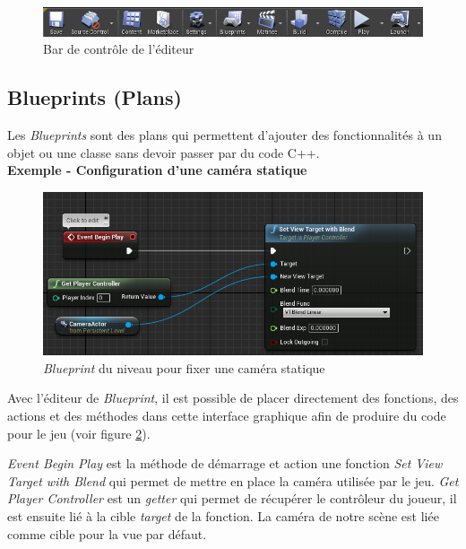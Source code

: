 \documentclass[11pt, a4paper, oneside]{article}
\begin{document}
\begin{center}
\begin{figure}[htp]
\includegraphics[scale=.8]{bardecontrole}
\caption{Bar de contrôle de l'éditeur}
\label{fig:bardecontrole}
\end{figure}
\end{center}

\subsection{Blueprints (Plans)}
Les \emph{Blueprints} sont des plans qui permettent d'ajouter des fonctionnalités à un objet ou une classe sans devoir passer par du code C++.\\[.4cm]
\textbf{Exemple - Configuration d'une caméra statique}
\begin{center}
\begin{figure}[htp]
\includegraphics[scale=.8]{blueprint}
\caption{\emph{Blueprint} du niveau pour fixer une caméra statique}
\label{fig:blueprint}
\end{figure}
\end{center}

Avec l'éditeur de \emph{Blueprint}, il est possible de placer directement des fonctions, des actions et des méthodes dans cette interface graphique afin de produire du code pour le jeu (voir figure \ref{fig:blueprint}).

\emph{Event Begin Play} est la méthode de démarrage et action une fonction \emph{Set View Target with Blend} qui permet de mettre en place la caméra utilisée par le jeu. \emph{Get Player Controller} est un \emph{getter} qui permet de récupérer le contrôleur du joueur, il est ensuite lié à la cible \emph{target} de la fonction. La caméra de notre scène est liée comme cible pour la vue par défaut.
\end{document}
